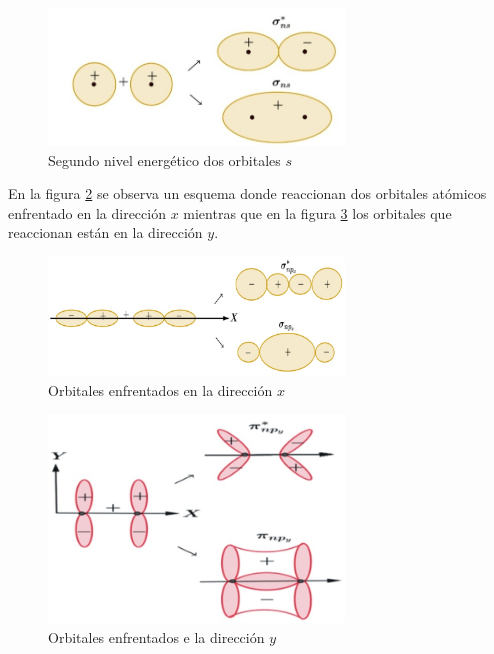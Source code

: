 \begin{figure}[H]
    \centering
    \includegraphics[width=0.7\textwidth]{./Figures/Molecula2doNivel1}
	\caption{Segundo nivel energético dos orbitales $s$}
	\label{fig:Molecula2doNivel1}
\end{figure}

En la figura \ref{fig:Molecula2doNivel2} se observa un esquema donde reaccionan dos orbitales atómicos enfrentado en la dirección $x$ mientras que en la figura \ref{fig:Molecula2doNivel3} los orbitales que reaccionan están en la dirección $y$.

\begin{figure}[H]
    \centering
    \includegraphics[width=0.7\textwidth]{./Figures/Molecula2doNivel2}
	\caption{Orbitales enfrentados en la dirección $x$}
	\label{fig:Molecula2doNivel2}
\end{figure}

\begin{figure}[H]
    \centering
    \includegraphics[width=0.7\textwidth]{./Figures/Molecula2doNivel3}
	\caption{Orbitales enfrentados e la dirección $y$}
	\label{fig:Molecula2doNivel3}
\end{figure}
	
